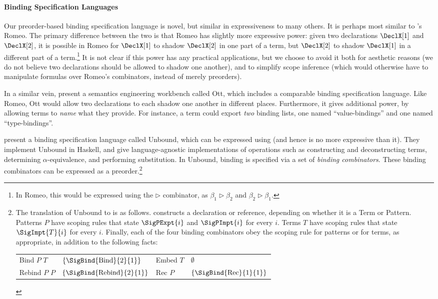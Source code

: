 \paragraph{Binding Specification Languages}

Our preorder-based binding specification language is novel, but
similar in expressiveness to many others.  It is perhaps most similar
to \cite{stansifer-romeo}'s Romeo.
The primary difference between the two is that
Romeo has slightly more expressive power: given two declarations
$\DeclX[1]$ and $\DeclX[2]$, it is possible in Romeo for $\DeclX[1]$
to shadow $\DeclX[2]$ in one part of a term, but $\DeclX[2]$ to shadow
$\DeclX[1]$ in a different part of a term.\footnote{
  In Romeo, this would be expressed using the $\rhd$ combinator,
  as $\beta_1 \rhd \beta_2$ and $\beta_2 \rhd \beta_1$.
} It is not clear
if this power has any practical applications, but we choose to avoid
it both for aesthetic reasons (we do not believe two declarations
should be allowed to shadow one another), and to simplify scope
inference (which would otherwise have to manipulate formulas over
Romeo's combinators, instead of merely preorders).

In a similar vein, \cite{sewell-ott-jfp} present a semantics engineering
workbench called Ott, which includes a comparable binding
specification language. Like Romeo, Ott would allow two declarations
to each shadow one another in different places. Furthermore, it gives
additional power, by allowing terms to \emph{name} what they provide.
For instance, a term could export \emph{two} binding lists, one named
``value-bindings'' and one named ``type-bindings''.

\cite{weirich-scope} present a binding specification language called
Unbound, which can be expressed using {\sap} (and
hence is no more expressive than it).
They implement Unbound in Haskell, and give language-agnostic
implementations of operations such as constructing and deconstructing
terms, determining $\alpha$-equivalence, and performing substitution.
In Unbound, binding is specified via a set of \emph{binding combinators}.
  These binding combinators can be expressed as a preorder.\footnote{
  The translation of Unbound to {\sap} is as follows. 
  constructs a declaration or reference, depending on whether it is a
  Term or Pattern. Patterns $P$ have scoping rules that state
  $\SigPExpt{i}$ and $\SigPImpt{i}$ for every $i$. Terms $T$ have
  scoping rules that state $\SigImpt{T}{i}$ for every $i$. Finally,
  each of the four binding combinators obey the scoping rule for
  patterns or for terms, as appropriate, in addition to the following
  facts:
  \begin{center}
  \begin{tabular}{l l @{\quad} l l}
    Bind $P$ $T$   & $\{\SigBind{\text{Bind}}{2}{1}\}$ &
    Embed $T$      & $\emptyset$ \\
    Rebind $P$ $P$ & $\{\SigBind{\text{Rebind}}{2}{1}\}$ &
    Rec $P$        & $\{\SigBind{\text{Rec}}{1}{1}\}$
  \end{tabular}
  \end{center}
}

